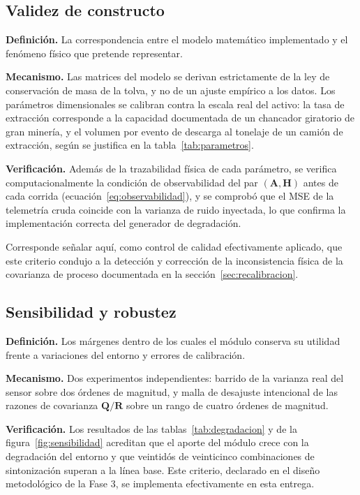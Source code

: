 \subsection{Validez de constructo}

\textbf{Definición.} La correspondencia entre el modelo matemático implementado
y el fenómeno físico que pretende representar.

\textbf{Mecanismo.} Las matrices del modelo se derivan estrictamente de la ley
de conservación de masa de la tolva, y no de un ajuste empírico a los datos. Los
parámetros dimensionales se calibran contra la escala real del activo: la tasa
de extracción corresponde a la capacidad documentada de un chancador giratorio
de gran minería, y el volumen por evento de descarga al tonelaje de un camión de
extracción, según se justifica en la tabla~\ref{tab:parametros}.

\textbf{Verificación.} Además de la trazabilidad física de cada parámetro, se
verifica computacionalmente la condición de observabilidad del par
$(\mathbf{A}, \mathbf{H})$ antes de cada corrida
(ecuación~\eqref{eq:observabilidad}), y se comprobó que el MSE de la telemetría
cruda coincide con la varianza de ruido inyectada, lo que confirma la
implementación correcta del generador de degradación.

Corresponde señalar aquí, como control de calidad efectivamente aplicado, que
este criterio condujo a la detección y corrección de la inconsistencia física de
la covarianza de proceso documentada en la sección~\ref{sec:recalibracion}.

\subsection{Sensibilidad y robustez}

\textbf{Definición.} Los márgenes dentro de los cuales el módulo conserva su
utilidad frente a variaciones del entorno y errores de calibración.

\textbf{Mecanismo.} Dos experimentos independientes: barrido de la varianza real
del sensor sobre dos órdenes de magnitud, y malla de desajuste intencional de
las razones de covarianza $\mathbf{Q}/\mathbf{R}$ sobre un rango de cuatro
órdenes de magnitud.

\textbf{Verificación.} Los resultados de las tablas~\ref{tab:degradacion} y de
la figura~\ref{fig:sensibilidad} acreditan que el aporte del módulo crece con la
degradación del entorno y que veintidós de veinticinco combinaciones de
sintonización superan a la línea base. Este criterio, declarado en el diseño
metodológico de la Fase 3, se implementa efectivamente en esta entrega.

